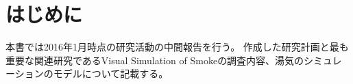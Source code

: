 \section{はじめに}
本書では2016年1月時点の研究活動の中間報告を行う。
作成した研究計画と最も重要な関連研究であるVisual Simulation of Smoke\cite{Fedkiw2001}の調査内容、湯気のシミュレーションのモデルについて記載する。